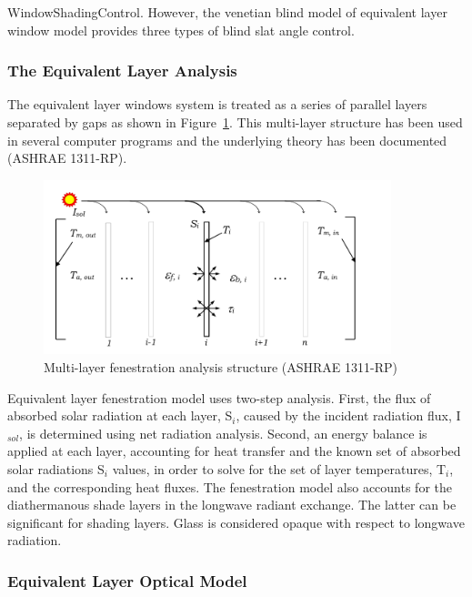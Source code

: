 WindowShadingControl. However, the venetian blind model of equivalent layer window model provides three types of blind slat angle control.

\subsubsection{The Equivalent Layer Analysis}\label{the-equivalent-layer-analysis}

The equivalent layer windows system is treated as a series of parallel layers separated by gaps as shown in Figure~\ref{fig:multi-layer-fenestration-analysis-structure}. This multi-layer structure has been used in several computer programs and the underlying theory has been documented (ASHRAE 1311-RP).

\begin{figure}[hbtp] %
\centering
\includegraphics[width=0.9\textwidth, height=0.9\textheight, keepaspectratio=true]{media/image1827.svg.png}
\caption{Multi-layer fenestration analysis structure (ASHRAE 1311-RP) \protect \label{fig:multi-layer-fenestration-analysis-structure}}
\end{figure}

Equivalent layer fenestration model uses two-step analysis. First, the flux of absorbed solar radiation at each layer, S\(_{i}\), caused by the incident radiation flux, I\(_{sol}\), is determined using net radiation analysis. Second, an energy balance is applied at each layer, accounting for heat transfer and the known set of absorbed solar radiations S\(_{i}\) values, in order to solve for the set of layer temperatures, T\(_{i}\), and the corresponding heat fluxes. The fenestration model also accounts for the diathermanous shade layers in the longwave radiant exchange. The latter can be significant for shading layers. Glass is considered opaque with respect to longwave radiation.

\subsubsection{Equivalent Layer Optical Model}\label{equivalent-layer-optical-model}

